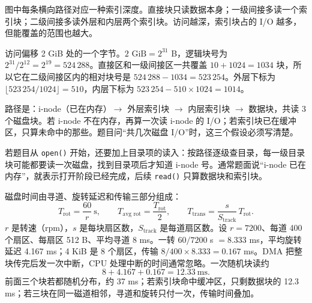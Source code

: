 图中每条横向路径对应一种索引深度。直接块只读数据本身；一级间接多读一个索引块；二级间接多读外层和内层两个索引块。访问越深，索引块占的 I/O 越多，但能覆盖的范围也越大。

访问偏移 2 GiB 处的一个字节。$2\text{ GiB}=2^{31}$ B，逻辑块号为 $2^{31}/2^{12}=2^{19}=524\,288$。直接区和一级间接区一共覆盖 $10+1024=1034$ 块，所以它在二级间接区内的相对块号是 $524\,288-1034=523\,254$。外层下标为 $\lfloor523\,254/1024\rfloor=510$，内层下标为 $523\,254-510\times1024=1014$。

路径是：i-node（已在内存）$\to$ 外层索引块 $\to$ 内层索引块 $\to$ 数据块，共读 3 个磁盘块。若 i-node 不在内存，再算一次读 i-node 的 I/O；若索引块已在缓冲区，只算未命中的那些。题目问“共几次磁盘 I/O”时，这三个假设必须写清楚。

若题目从 \texttt{open()} 开始，还要加上目录项的读入：按路径逐级查目录，每一级目录块可能都要读一次磁盘，找到目录项后才知道 i-node 号。通常题面说“i-node 已在内存”，就表示打开阶段已经完成，后续 \texttt{read()} 只算数据块和索引块。

磁盘时间由寻道、旋转延迟和传输三部分组成：
\[
T_{\text{rot}}=\frac{60}{r}\ \text{s},\qquad
T_{\text{avg rot}}=\frac{T_{\text{rot}}}{2},\qquad
T_{\text{trans}}=\frac{s}{S_{\text{track}}}\,T_{\text{rot}}.
\]
$r$ 是转速（rpm），$s$ 是每块扇区数，$S_{\text{track}}$ 是每道扇区数。设 $r=7200$、每道 400 个扇区、每扇区 512 B、平均寻道 8 ms。一转 $60/7200$ s $=8.333$ ms，平均旋转延迟 4.167 ms；4 KiB 是 8 个扇区，传输 $8/400\times8.333=0.167$ ms。DMA 把整块传完后发一次中断，CPU 处理中断的时间通常忽略。一次随机块读约
\[
8+4.167+0.167=12.33\ \text{ms}.
\]
前面三个块若都随机分布，约 37 ms；若索引块命中缓冲区，只剩数据块的 12.3 ms；若三块在同一磁道相邻，寻道和旋转只付一次，传输时间叠加。

\begin{center}
\end{center}

